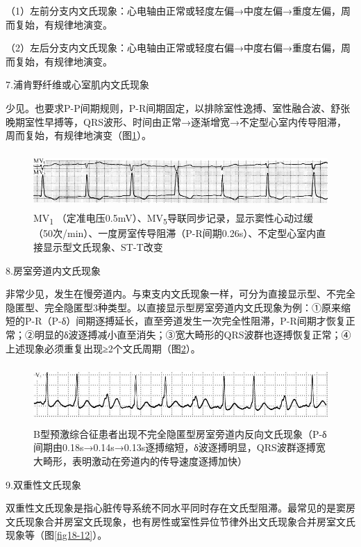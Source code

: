 （1）左前分支内文氏现象：心电轴由正常或轻度左偏→中度左偏→重度左偏，周而复始，有规律地演变。

（2）左后分支内文氏现象：心电轴由正常或轻度右偏→中度右偏→重度右偏，周而复始，有规律地演变。

7.浦肯野纤维或心室肌内文氏现象

少见。也要求P-P间期规则，P-R间期固定，以排除室性逸搏、室性融合波、舒张晚期室性早搏等，QRS波形、时间由正常→逐渐增宽→不定型心室内传导阻滞，周而复始，有规律地演变（图\ref{fig18-10}）。

\begin{figure}[!htbp]
 \centering
 \includegraphics[width=5.58333in,height=0.84375in]{./images/Image00311.jpg}
 \captionsetup{justification=centering}
 \caption{MV\textsubscript{1} （定准电压0.5mV）、MV\textsubscript{5}导联同步记录，显示窦性心动过缓（50次/min）、一度房室传导阻滞（P-R间期0.26s）、不定型心室内直接显示型文氏现象、ST-T改变}
 \label{fig18-10}
  \end{figure} 


8.房室旁道内文氏现象

非常少见，发生在慢旁道内。与束支内文氏现象一样，可分为直接显示型、不完全隐匿型、完全隐匿型3种类型。以直接显示型房室旁道内文氏现象为例：①原来缩短的P-R（P-δ）间期逐搏延长，直至旁道发生一次完全性阻滞，P-R间期才恢复正常；②明显的δ波逐搏减小直至消失；③宽大畸形的QRS波群也逐搏恢复正常；④上述现象必须重复出现≥2个文氏周期（图\ref{fig18-11}）。

\begin{figure}[!htbp]
 \centering
 \includegraphics[width=5.625in,height=0.88542in]{./images/Image00312.jpg}
 \captionsetup{justification=centering}
 \caption{B型预激综合征患者出现不完全隐匿型房室旁道内反向文氏现象（P-δ间期由0.18s→0.14s→0.13s逐搏缩短，δ波逐搏明显，QRS波群逐搏宽大畸形，表明激动在旁道内的传导速度逐搏加快）}
 \label{fig18-11}
  \end{figure} 

9.双重性文氏现象

双重性文氏现象是指心脏传导系统不同水平同时存在文氏型阻滞。最常见的是窦房文氏现象合并房室文氏现象，也有房性或室性异位节律外出文氏现象合并房室文氏现象等（图\ref{fig18-12}）。

